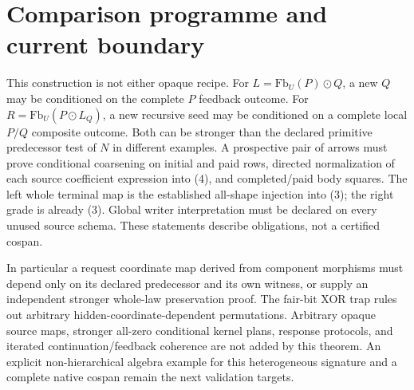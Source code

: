 \documentclass[11pt]{article}
\begin{document}
\section{Comparison programme and current boundary}
This construction is not either opaque recipe. For $L=\mathrm{Fb}_U(P)\odot Q$, a new $Q$ may be conditioned on the complete $P$ feedback outcome. For $R=\mathrm{Fb}_U(P\odot L_Q)$, a new recursive seed may be conditioned on a complete local $P/Q$ composite outcome. Both can be stronger than the declared primitive predecessor test of $N$ in different examples. A prospective pair of arrows must prove conditional coarsening on initial and paid rows, directed normalization of each source coefficient expression into (4), and completed/paid body squares. The left whole terminal map is the established all-shape injection into (3); the right grade is already (3). Global writer interpretation must be declared on every unused source schema. These statements describe obligations, not a certified cospan.

In particular a request coordinate map derived from component morphisms must depend only on its declared predecessor and its own witness, or supply an independent stronger whole-law preservation proof. The fair-bit XOR trap rules out arbitrary hidden-coordinate-dependent permutations. Arbitrary opaque source maps, stronger all-zero conditional kernel plans, response protocols, and iterated continuation/feedback coherence are not added by this theorem. An explicit non-hierarchical algebra example for this heterogeneous signature and a complete native cospan remain the next validation targets.
\end{document}
